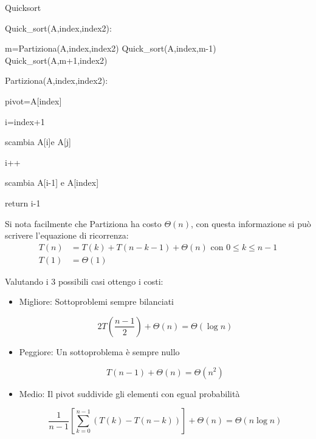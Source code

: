 \documentclass{article}
\begin{document}
\begin{algorithm}[ht]
\caption{Quicksort}
\begin{algorithmic}
\State Quick\_sort(A,index,index2):


        \State m=Partiziona(A,index,index2)
        \State Quick\_sort(A,index,m-1)
        \State Quick\_sort(A,m+1,index2)

    \EndIf

\State

\State Partiziona(A,index,index2): 

    \State pivot=A[index]

    \State i=index+1



            \State scambia A[i]e A[j]

            \State i++

        \EndIf

    \EndFor

\State scambia A[i-1] e A[index]

\State return i-1

\end{algorithmic}
\end{algorithm}

\noindent Si nota facilmente che Partiziona ha costo $\Theta(n)$, con questa informazione si può scrivere l'equazione di ricorrenza:
\begin{equation}
    \nonumber
    \begin{split}
        T(n)&=T(k)+T(n-k-1)+\Theta(n)\text{ con $0\leq k\leq n-1$}\\
        T(1)&=\Theta(1)
    \end{split}
\end{equation}

\noindent Valutando i 3 possibili casi ottengo i costi:
\begin{itemize}

    \item Migliore: Sottoproblemi sempre bilanciati 

    $$2T(\frac{n-1}{2})+\Theta(n)=\Theta(\log n)$$

    \item Peggiore: Un sottoproblema è sempre nullo

    $$T(n-1)+\Theta(n)=\Theta(n^2)$$

    \item Medio: Il pivot suddivide gli elementi con egual probabilità

    $$\frac{1}{n-1}\left[ \sum_{k=0}^{n-1}(T(k)-T(n-k))\right]+\Theta(n)=\Theta(n\log n)$$
    
\end{itemize}
\end{document}

